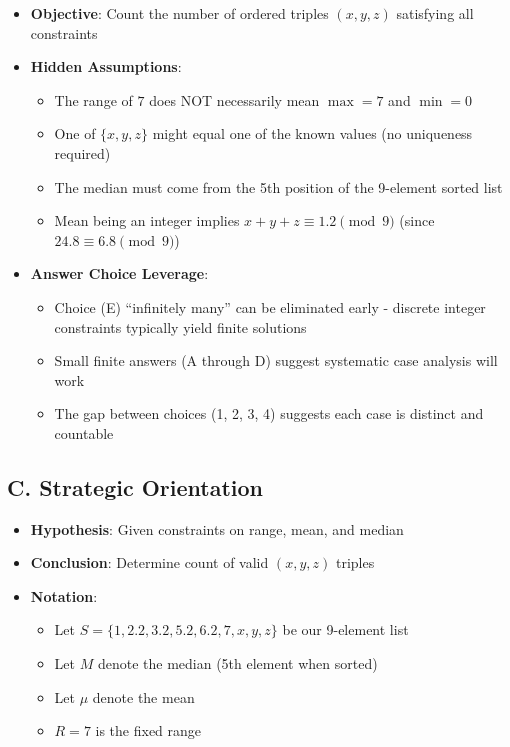 \documentclass[11pt]{article}
\begin{document}
\begin{problemconfigbox}
\begin{itemize}[leftmargin=*]
    \item \textbf{Objective}: Count the number of ordered triples $(x, y, z)$ satisfying all constraints
    
    \item \textbf{Hidden Assumptions}: 
    \begin{itemize}
        \item The range of $7$ does NOT necessarily mean $\max = 7$ and $\min = 0$
        \item One of $\{x, y, z\}$ might equal one of the known values (no uniqueness required)
        \item The median must come from the 5th position of the 9-element sorted list
        \item Mean being an integer implies $x + y + z \equiv 1.2 \pmod{9}$ (since $24.8 \equiv 6.8 \pmod{9}$)
    \end{itemize}
    
    \item \textbf{Answer Choice Leverage}: 
    \begin{itemize}
        \item Choice (E) ``infinitely many'' can be eliminated early - discrete integer constraints typically yield finite solutions
        \item Small finite answers (A through D) suggest systematic case analysis will work
        \item The gap between choices (1, 2, 3, 4) suggests each case is distinct and countable
    \end{itemize}
\end{itemize}

\subsection*{C. Strategic Orientation}
\begin{itemize}[leftmargin=*]
    \item \textbf{Hypothesis}: Given constraints on range, mean, and median
    \item \textbf{Conclusion}: Determine count of valid $(x, y, z)$ triples
    \item \textbf{Notation}: 
    \begin{itemize}
        \item Let $S = \{1, 2.2, 3.2, 5.2, 6.2, 7, x, y, z\}$ be our 9-element list
        \item Let $M$ denote the median (5th element when sorted)
        \item Let $\mu$ denote the mean
        \item $R = 7$ is the fixed range
    \end{itemize}
    

\end{itemize}
\end{problemconfigbox}
\end{document}
